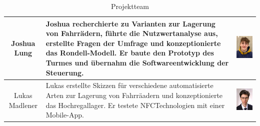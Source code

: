 \begin{table}[H]
\begin{tabular}{cp{}c}
    \midrule
    Joshua Lung    & Joshua recherchierte zu Varianten zur Lagerung von Fahrrädern, führte die Nutzwertanalyse aus, erstellte Fragen der Umfrage und konzeptionierte das Rondell-Modell. Er baute den Prototyp des Turmes und übernahm die Softwareentwicklung der Steuerung. & \begin{minipage}{.3\textwidth}\includegraphics{images/joshualung.jpg} \end{minipage}    \\
    \midrule
    Lukas Madlener & Lukas erstellte Skizzen für verschiedene automatisierte Arten zur Lagerung von Fahrräadern und konzeptionierte das Hochregallager. Er testete NFCTechnologien mit einer Mobile-App.                                                                      & \begin{minipage}{.3\textwidth}\includegraphics{images/lukasmadlener.jpg} \end{minipage} \\
    \bottomrule
  \end{tabular}
  \caption{Projektteam}
  \label{tab:projektteam}
\end{table}

